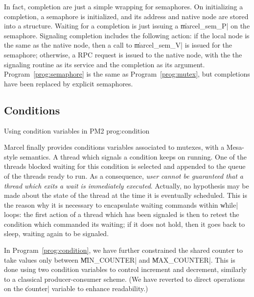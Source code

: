 In fact, completion are just a simple wrapping for semaphores. On
initializing a completion, a semaphore is initialized, and its address
and native node are stored into a structure. Waiting for a completion
is just issuing a \|marcel_sem_P| on the semaphore.  Signaling
completion includes the following action: if the local node is the
same as the native node, then a call to \|marcel_sem_V| is issued for
the semaphore; otherwise, a RPC request is issued to the native node,
with the the signaling routine as its service and the completion as
its argument. Program~\ref{prog:semaphore} is the same as
Program~\ref{prog:mutex}, but completions have been replaced by
explicit semaphores.

\subsection{Conditions}

 {Using condition variables in PM2}
 {prog:condition}

Marcel finally provides conditions variables associated to mutexes,
with a Mesa-style semantics. A thread which signals a condition keeps
on running. One of the threads blocked waiting for this condition is
selected and appended to the queue of the threads ready to run. As a
consequence, \emph{user cannot be guaranteed that a thread which exits
  a wait is immediately executed}. Actually, no hypothesis may be made
about the state of the thread at the time it is eventually
scheduled. This is the reason why it is necessary to encapsulate
waiting commands within \|while| loops: the first action of a thread
which has been signaled is then to retest the condition which
commanded its waiting; if it does not hold, then it goes back to
sleep, waiting again to be signaled.

In Program~\ref{prog:condition}, we have further constrained the
shared counter to take values only between \|MIN_COUNTER| and
\|MAX_COUNTER|. This is done using two condition variables
to control increment and decrement, similarly to a classical
producer-consumer scheme. (We have reverted to direct operations on
the \|counter| variable to enhance readability.) 


